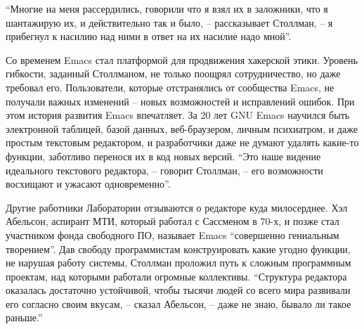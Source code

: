 \enquote{Многие на меня рассердились, говорили что я взял их в заложники, что я шантажирую их, и действительно так и было, -- рассказывает Столлман, -- я прибегнул к насилию над ними в ответ на их насилие надо мной}.

Со временем Emacs стал платформой для продвижения хакерской этики. Уровень гибкости, заданный Столлманом, не только поощрял сотрудничество, но даже требовал его. Пользователи, которые отстранялись от сообщества Emacs, не получали важных изменений -- новых возможностей и исправлений ошибок. При этом история развития Emacs впечатляет. За 20 лет GNU Emacs научился быть электронной таблицей, базой данных, веб-браузером, личным психиатром, и даже простым текстовым редактором, и разработчики даже не думают удалять какие-то функции, заботливо перенося их в код новых версий. \enquote{Это наше видение идеального текстового редактора, -- говорит Столлман, -- его возможности восхищают и ужасают одновременно}.

Другие работники Лаборатории отзываются о редакторе куда милосерднее. Хэл Абельсон, аспирант МТИ, который работал с Сассменом в 70-х, и позже стал участником фонда свободного ПО, называет Emacs \enquote{совершенно гениальным творением}. Дав свободу программистам конструировать какие угодно функции, не нарушая работу системы, Столлман проложил путь к сложным программным проектам, над которыми работали огромные коллективы. \enquote{Структура редактора оказалась достаточно устойчивой, чтобы тысячи людей со всего мира развивали его согласно своим вкусам, -- сказал Абельсон, -- даже не знаю, бывало ли такое раньше.}

